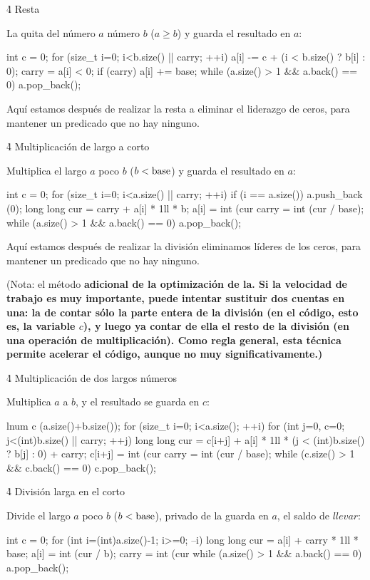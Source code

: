 \h4{ Resta }

La quita del número $a$ número $b$ ($a \ge b$) y guarda el resultado en $a$:

\code
int c = 0;
for (size_t i=0; i<b.size() || carry; ++i) {
a[i] -= c + (i < b.size() ? b[i] : 0);
carry = a[i] < 0;
if (carry) a[i] += base;
}
while (a.size() > 1 && a.back() == 0)
a.pop_back();
\endcode

Aquí estamos después de realizar la resta a eliminar el liderazgo de ceros, para mantener un predicado que no hay ninguno.


\h4{ Multiplicación de largo a corto }

Multiplica el largo $a$ poco $b$ ($b < {\rm base}$) y guarda el resultado en $a$:

\code
int c = 0;
for (size_t i=0; i<a.size() || carry; ++i) {
if (i == a.size())
a.push_back (0);
long long cur = carry + a[i] * 1ll * b;
a[i] = int (cur %
carry = int (cur / base);
}
while (a.size() > 1 && a.back() == 0)
a.pop_back();
\endcode

Aquí estamos después de realizar la división eliminamos líderes de los ceros, para mantener un predicado que no hay ninguno.

(Nota: el método \bf{adicional de la optimización de la}. Si la velocidad de trabajo es muy importante, puede intentar sustituir dos cuentas en una: la de contar sólo la parte entera de la división (en el código, esto es, la variable $c$), y luego ya contar de ella el resto de la división (en una operación de multiplicación). Como regla general, esta técnica permite acelerar el código, aunque no muy significativamente.)


\h4{ Multiplicación de dos largos números }

Multiplica $a$ a $b$, y el resultado se guarda en $c$:

\code
lnum c (a.size()+b.size());
for (size_t i=0; i<a.size(); ++i)
for (int j=0, c=0; j<(int)b.size() || carry; ++j) {
long long cur = c[i+j] + a[i] * 1ll * (j < (int)b.size() ? b[j] : 0) + carry;
c[i+j] = int (cur %
carry = int (cur / base);
}
while (c.size() > 1 && c.back() == 0)
c.pop_back();
\endcode


\h4{ División larga en el corto }

Divide el largo $a$ poco $b$ ($b < {\rm base}$), privado de la guarda en $a$, el saldo de $llevar$:

\code
int c = 0;
for (int i=(int)a.size()-1; i>=0; --i) {
long long cur = a[i] + carry * 1ll * base;
a[i] = int (cur / b);
carry = int (cur %
}
while (a.size() > 1 && a.back() == 0)
a.pop_back();
\endcode


